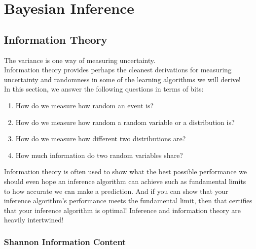 \section{Bayesian Inference}

\subsection{Information Theory}

The variance is one way of measuring uncertainty. \\

Information theory provides perhaps the cleanest derivations for measuring uncertainty and randomness in some of the learning algorithms we will derive! \\

In this section, we answer the following questions in terms of bits:


\begin{enumerate}
    \item How do we measure how random an event is?
    \item How do we measure how random a random variable or a distribution is?
    \item How do we measure how different two distributions are?
    \item How much information do two random variables share?
\end{enumerate}

Information theory is often used to show what the best possible performance we should even hope an inference algorithm can achieve such as fundamental limits to how accurate we can make a prediction. And if you can show that your inference algorithm's performance meets the fundamental limit, then that certifies that your inference algorithm is optimal! Inference and information theory are heavily intertwined!

\subsubsection{Shannon Information Content}


